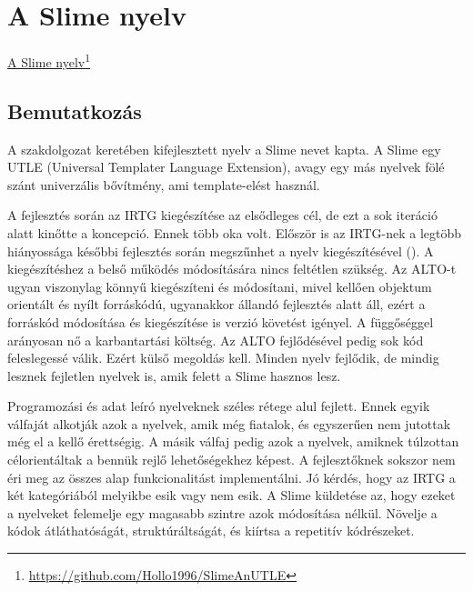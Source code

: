 
\chapter{A Slime nyelv}{\href{https://github.com/Hollo1996/SlimeAnUTLE}{A Slime nyelv}\footnote{\url{https://github.com/Hollo1996/SlimeAnUTLE}}}
\label{sec:Slime}
\section{Bemutatkozás}
\label{sec:SIntro}
A szakdolgozat keretében kifejlesztett nyelv a Slime nevet kapta.
A Slime egy UTLE (Universal Templater Language Extension), 
avagy egy más nyelvek fölé szánt univerzális bővítmény, ami template-elést használ.

A fejlesztés során az IRTG kiegészítése az elsődleges cél, de ezt a sok iteráció alatt kinőtte a koncepció. 
Ennek több oka volt. 
Először is az IRTG-nek a legtöbb hiányossága későbbi fejlesztés során megszűnhet a nyelv kiegészítésével ().
A kiegészítéshez a belső működés módosítására nincs feltétlen szükség. 
Az ALTO-t ugyan viszonylag könnyű kiegészíteni és módosítani, mivel kellően objektum orientált és nyílt forráskódú,
ugyanakkor állandó fejlesztés alatt áll, ezért a forráskód módosítása és kiegészítése is verzió követést igényel. 
A függőséggel arányosan nő a karbantartási költség. 
Az ALTO fejlődésével pedig sok kód feleslegessé válik. 
Ezért külső megoldás kell. 
Minden nyelv fejlődik, de mindig lesznek fejletlen nyelvek is, amik felett a Slime hasznos lesz.

Programozási és adat leíró nyelveknek széles rétege alul fejlett. 
Ennek egyik válfaját alkotják azok a nyelvek, amik még fiatalok, és egyszerűen nem jutottak még el a kellő érettségig. 
A másik válfaj pedig azok a nyelvek, amiknek túlzottan célorientáltak a bennük rejlő lehetőségekhez képest.
A fejlesztőknek sokszor nem éri meg az összes alap funkcionalitást implementálni. 
Jó kérdés, hogy az IRTG a két kategóriából melyikbe esik vagy nem esik. 
A Slime küldetése az, hogy ezeket a nyelveket felemelje egy magasabb szintre azok módosítása nélkül. 
Növelje a kódok átláthatóságát, struktúráltságát, és kiírtsa a repetitív kódrészeket.

